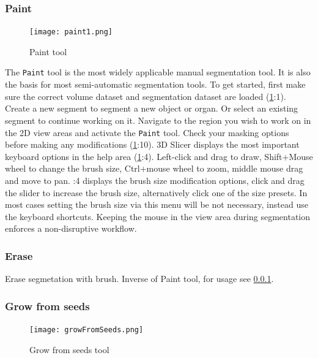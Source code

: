 \subsubsection{Paint}\label{section:paint}
\begin{figure}[h!]
	\centerline{
		\texttt{[image: paint1.png]}}
	\caption{Paint tool}\label{fig:paint}
\end{figure}
\noindent
The \texttt{Paint} tool is the most widely applicable manual segmentation tool. It is also the basis for most semi-automatic segmentation tools.
To get started, first make sure the correct volume dataset and segmentation dataset are loaded (\cref{fig:paint}:1).
Create a new segment to segment a new object or organ.
Or select an existing segment to continue working on it.
Navigate to the region you wish to work on in the 2D view areas and activate the \texttt{Paint} tool.
Check your masking options before making any modifications (\cref{fig:paint}:10).
3D Slicer displays the most important keyboard options in the help area (\cref{fig:paint}:4).
Left-click and drag to draw, Shift+Mouse wheel to change the brush size, Ctrl+mouse wheel to zoom, middle mouse drag and move to pan.
:4 displays the brush size modification options, click and drag the slider to increase the brush size, alternatively click one of the size presets.
In most cases setting the brush size via this menu will be not necessary, instead use the keyboard shortcuts.
Keeping the mouse in the view area during segmentation enforces a non-disruptive workflow.
\pagebreak
\subsubsection{Erase}
Erase segmetation with brush. Inverse of Paint tool, for usage see \cref{section:paint}.

\subsubsection{Grow from seeds}
\begin{figure}[h!]
	\centerline{
		\texttt{[image: growFromSeeds.png]}}
	\caption{Grow from seeds tool}\label{fig:gfs}
\end{figure}

